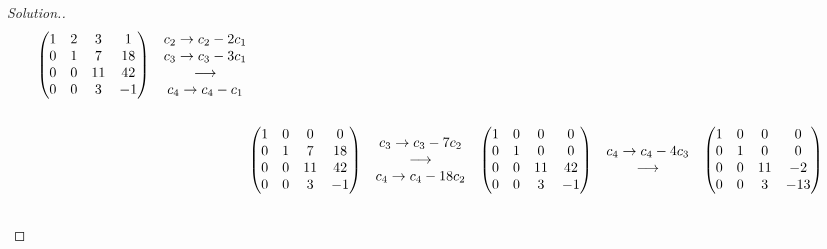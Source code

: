 \documentclass[11pt,a4paper]{article}
\theoremstyle{definition}
\newenvironment{solution}
  {\renewcommand{\qedsymbol}{}\begin{proof}[\textit{Solution}.]}
  {\end{proof}}
\begin{document}
\begin{solution}
\begin{align*}
\begin{matrix}
\end{matrix}
\hspace{0.3cm}
\begin{pmatrix}
1&2&3&1\\0&1&7&18\\0&0&11&42\\0&0&3&-1\\
\end{pmatrix}
\hspace{0.3cm}
\begin{matrix}
c_2\rightarrow c_2-2c_1\\c_3\rightarrow c_3-3c_1\\ \longrightarrow\\ c_4\rightarrow c_4-c_1\\
\end{matrix}\\\\
&
\begin{pmatrix}
1&0&0&0\\0&1&7&18\\0&0&11&42\\0&0&3&-1\\
\end{pmatrix}
\hspace{0.3cm}
\begin{matrix}
c_3\rightarrow c_3-7c_2\\ \longrightarrow\\ c_4\rightarrow c_4-18c_2\\
\end{matrix}
\hspace{0.3cm}
\begin{pmatrix}
1&0&0&0\\0&1&0&0\\0&0&11&42\\0&0&3&-1\\
\end{pmatrix}
\hspace{0.3cm}
\begin{matrix}
c_4\rightarrow c_4-4c_3\\ \longrightarrow\\
\end{matrix}
\hspace{0.3cm}
\begin{pmatrix}
1&0&0&0\\0&1&0&0\\0&0&11&-2\\0&0&3&-13\\
\end{pmatrix}\\\\

\end{align*}
\end{solution}
\end{document}

